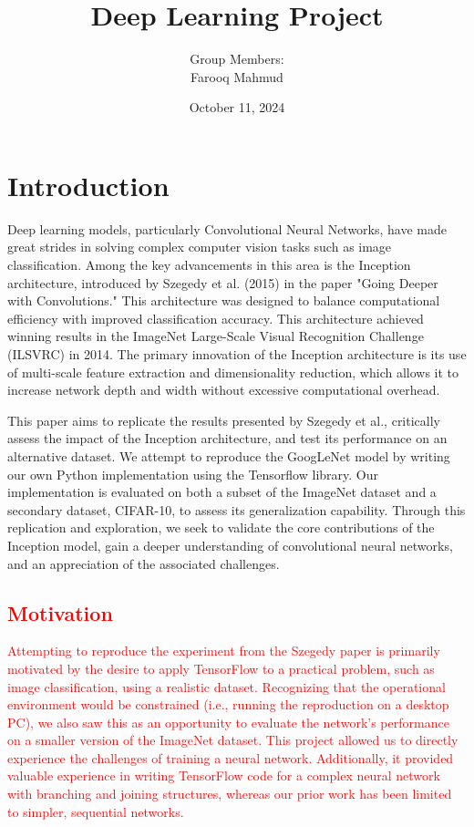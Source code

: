 \documentclass{article}
\title{Deep Learning Project}
\author{
    Group Members: \\
    Farooq Mahmud
}
\date{October 11, 2024}
\begin{document}
\maketitle

\section{Introduction}
Deep learning models, particularly Convolutional Neural Networks, have made great strides in solving complex computer vision tasks such as image classification. Among the key advancements in this area is the Inception architecture, introduced by Szegedy et al. (2015) in the paper "Going Deeper with Convolutions." This architecture was designed to balance computational efficiency with improved classification accuracy. This architecture achieved winning results in the ImageNet Large-Scale Visual Recognition Challenge (ILSVRC) in 2014. The primary innovation of the Inception architecture is its use of multi-scale feature extraction and dimensionality reduction, which allows it to increase network depth and width without excessive computational overhead\cite{szegedy2015going}.

This paper aims to replicate the results presented by Szegedy et al., critically assess the impact of the Inception architecture, and test its performance on an alternative dataset. We attempt to reproduce the GoogLeNet model by writing our own Python implementation using the Tensorflow library. Our implementation is evaluated on both a subset of the ImageNet dataset and a secondary dataset, CIFAR-10, to assess its generalization capability. Through this replication and exploration, we seek to validate the core contributions of the Inception model, gain a deeper understanding of convolutional neural networks, and an appreciation of the associated challenges.

\textcolor{red}{
\section {Motivation}
Attempting to reproduce the experiment from the Szegedy paper is primarily motivated by the desire to apply TensorFlow to a practical problem, such as image classification, using a realistic dataset. Recognizing that the operational environment would be constrained (i.e., running the reproduction on a desktop PC), we also saw this as an opportunity to evaluate the network's performance on a smaller version of the ImageNet dataset. This project allowed us to directly experience the challenges of training a neural network. Additionally, it provided valuable experience in writing TensorFlow code for a complex neural network with branching and joining structures, whereas our prior work has been limited to simpler, sequential networks.}
\end{document}
